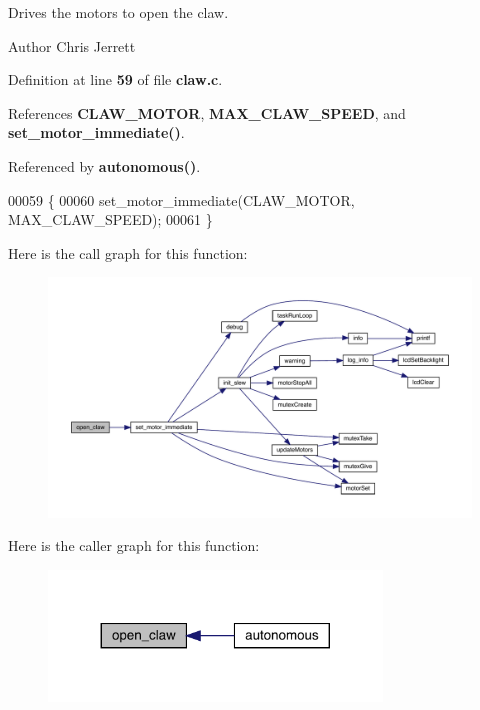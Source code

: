 Drives the motors to open the claw. 

\begin{DoxyAuthor}{Author}
Chris Jerrett 
\end{DoxyAuthor}


Definition at line \textbf{ 59} of file \textbf{ claw.\+c}.



References \textbf{ C\+L\+A\+W\+\_\+\+M\+O\+T\+OR}, \textbf{ M\+A\+X\+\_\+\+C\+L\+A\+W\+\_\+\+S\+P\+E\+ED}, and \textbf{ set\+\_\+motor\+\_\+immediate()}.



Referenced by \textbf{ autonomous()}.


\begin{DoxyCode}
00059                  \{
00060   set_motor_immediate(CLAW_MOTOR, MAX_CLAW_SPEED);
00061 \}
\end{DoxyCode}
Here is the call graph for this function\+:\nopagebreak
\begin{figure}[H]
\begin{center}
\leavevmode
\includegraphics[width=350pt]{claw_8c_a03023ca28f671b9fa7bac07782ccd8c1_cgraph}
\end{center}
\end{figure}
Here is the caller graph for this function\+:\nopagebreak
\begin{figure}[H]
\begin{center}
\leavevmode
\includegraphics[width=251pt]{claw_8c_a03023ca28f671b9fa7bac07782ccd8c1_icgraph}
\end{center}
\end{figure}
\mbox{\label{claw_8c_a3a57f998b1884d39b0cc786689f7086f}} 
